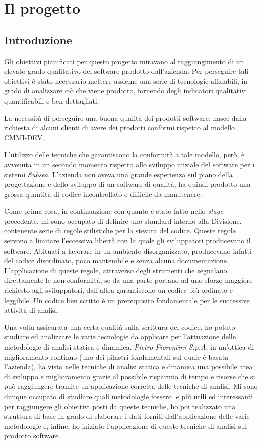 \newcommand{\code}[1]{\texttt{#1}}
\chapter{Il progetto}

\section{Introduzione}
Gli obiettivi pianificati per questo progetto miravano al raggiungimento di un elevato grado qualitativo del software prodotto dall'azienda. Per perseguire tali obiettivi è stato necessario mettere assieme una serie di tecnologie affidabili, in grado di analizzare ciò che viene prodotto, fornendo degli indicatori qualitativi quantificabili e ben dettagliati.

La necessità di perseguire una buona qualità dei prodotti software, nasce dalla richiesta di alcuni clienti di avere dei prodotti conformi rispetto al modello CMMI-DEV.

L'utilizzo delle tecniche che garantiscono la conformità a tale modello, però, è avvenuta in un secondo momento rispetto allo sviluppo iniziale del software per i sistemi \textit{Subsea}. L'azienda non aveva una grande esperienza sul piano della progettazione e dello sviluppo di un software di qualità, ha quindi prodotto una grossa quantità di codice incontrollato e difficile da manutenere. 

Come prima cosa, in continuazione con quanto è stato fatto nello \textit{stage} precedente, mi sono occupato di definire uno standard interno alla Divisione, contenente serie di regole stilistiche per la stesura del codice. Queste regole servono a limitare l'eccessiva libertà con la quale gli sviluppatori producevano il software. Abituati a lavorare in un ambiente disorganizzato, producevano infatti del codice disordinato, poco mantenibile e senza alcuna documentazione. L'applicazione di queste regole, attraverso degli strumenti che segnalano direttamente le non conformità, se da una parte portano ad uno sforzo maggiore richiesto agli sviluppatori, dall'altra garantiscono un codice più ordinato e leggibile. Un codice ben scritto è un prerequisito fondamentale per le successive attività di analisi.

Una volta assicurata una certa qualità sulla scrittura del codice, ho potuto studiare ed analizzare le varie tecnologie da applicare per l'attuazione delle metodologie di analisi statica e dinamica. 
\textit{Pietro Fiorentini S.p.A}, in un'ottica di miglioramento continuo (uno dei pilastri fondamentali sul quale è basata l'azienda), ha visto nelle tecniche di analisi statica e dinamica una possibile area di sviluppo e miglioramento grazie al possibile risparmio di tempo e risorse che si può raggiungere tramite un'applicazione corretta delle tecniche di analisi. Mi sono dunque occupato di studiare quali metodologie fossero le più utili ed interessanti per raggiungere gli obiettivi posti da queste tecniche, ho poi realizzato una struttura di base in grado di elaborare i dati forniti dall'applicazione delle varie metodologie e, infine, ho iniziato l'applicazione di queste tecniche di analisi sul prodotto software.

